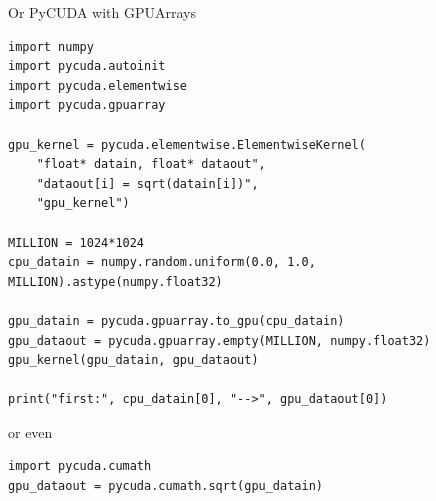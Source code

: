 \documentclass[aspectratio=169]{beamer}
\begin{document}

\begin{frame}[fragile]{Or PyCUDA with GPUArrays}
\vspace{0.2 cm}
\scriptsize
\begin{verbatim}
import numpy
import pycuda.autoinit
import pycuda.elementwise
import pycuda.gpuarray

gpu_kernel = pycuda.elementwise.ElementwiseKernel(
    "float* datain, float* dataout",
    "dataout[i] = sqrt(datain[i])",
    "gpu_kernel")

MILLION = 1024*1024
cpu_datain = numpy.random.uniform(0.0, 1.0, MILLION).astype(numpy.float32)

gpu_datain = pycuda.gpuarray.to_gpu(cpu_datain)
gpu_dataout = pycuda.gpuarray.empty(MILLION, numpy.float32)
gpu_kernel(gpu_datain, gpu_dataout)

print("first:", cpu_datain[0], "-->", gpu_dataout[0])
\end{verbatim}

\vspace{0.15 cm}
\normalsize
or even

\vspace{0.15 cm}
\scriptsize
\begin{verbatim}
import pycuda.cumath
gpu_dataout = pycuda.cumath.sqrt(gpu_datain)
\end{verbatim}
\end{frame}
\end{document}
